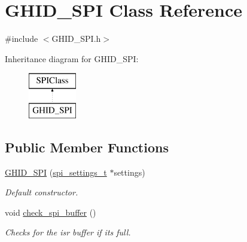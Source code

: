 \hypertarget{class_g_h_i_d___s_p_i}{\section{\-G\-H\-I\-D\-\_\-\-S\-P\-I \-Class \-Reference}
\label{class_g_h_i_d___s_p_i}
}


{\ttfamily \#include $<$\-G\-H\-I\-D\-\_\-\-S\-P\-I.\-h$>$}

\-Inheritance diagram for \-G\-H\-I\-D\-\_\-\-S\-P\-I\-:\begin{figure}[H]
\begin{center}
\leavevmode
\includegraphics[height=2.000000cm]{class_g_h_i_d___s_p_i}
\end{center}
\end{figure}
\subsection*{\-Public \-Member \-Functions}
\begin{DoxyCompactItemize}
\item 
\hyperlink{class_g_h_i_d___s_p_i_a71372a4a455b9ef0a27026f386d88c8d}{\-G\-H\-I\-D\-\_\-\-S\-P\-I} (\hyperlink{structspi__settings__t}{spi\-\_\-settings\-\_\-t} $\ast$settings)
\begin{DoxyCompactList}\small\item\em \-Default constructor. \end{DoxyCompactList}\item 
void \hyperlink{class_g_h_i_d___s_p_i_a81d883b745c3848fb920df0ceb76ab08}{check\-\_\-spi\-\_\-buffer} ()
\begin{DoxyCompactList}\small\item\em \-Checks for the isr buffer if its full. \end{DoxyCompactList}\end{DoxyCompactItemize}
